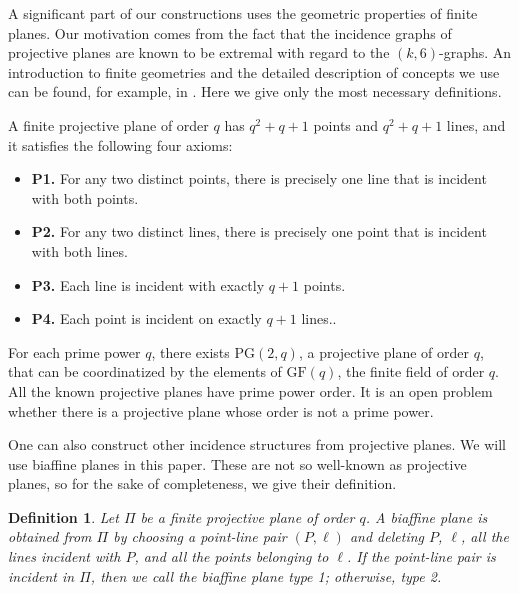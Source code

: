 \documentclass[a4paper,11pt]{article}
\newtheorem{definition}[theorem]{Definition}
\begin{document}

A significant part of our constructions uses the geometric properties of finite planes. Our motivation comes from the fact that the incidence graphs of projective planes are known to be extremal with regard to the $(k,6)$-graphs. An introduction to finite geometries and the detailed description of concepts we use can be found, for example, in \cite{KSz}. Here we give only the most necessary definitions.


A finite projective plane of order $q$ has $q^2+q+1$ points and $q^2+q+1$ lines, and it satisfies the following four axioms:
\begin{itemize}
\item{\bf P1.} 
For any two distinct points, there is precisely one line 
that is incident with both points.
\item{\bf P2.} 
For any two distinct lines, there is precisely one point that is incident with both lines.
\item{\bf P3.}
Each line is incident with exactly $q+1$ points.
\item{\bf P4.}
Each point is incident on exactly $q+1$ lines..
\end{itemize}
For each prime power $q$, there exists $\mathrm{PG}(2,q)$, a projective plane of order $q$, that can be coordinatized by the elements of $\mathrm{GF}(q)$, the finite field of order $q$. All the known projective planes have prime power order. It is an open problem whether there is a projective plane whose order is not a prime power.

One can also construct other incidence structures from projective planes. We will use biaffine planes in this paper. These are not so well-known as projective planes, so for the sake of completeness, we give their definition.

\begin{definition}
Let $\Pi$ be a finite projective plane of order $q$. A biaffine plane is obtained from $\Pi$ by choosing a point-line pair $(P,\ell )$ and deleting $P$, $\ell$, all the lines incident with $P$, and all the points belonging to $\ell$. If the point-line pair is incident in $\Pi$, then we call the biaffine plane type 1; otherwise, type 2.
\end{definition}
\end{document}
